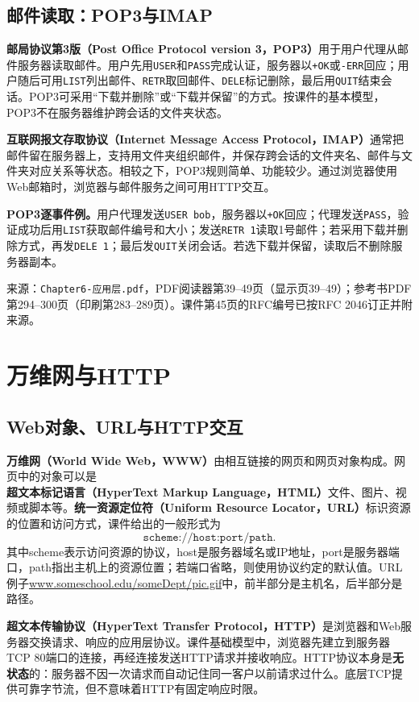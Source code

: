 \subsection{邮件读取：POP3与IMAP}
\textbf{邮局协议第3版（Post Office Protocol version 3，POP3）}用于用户代理从邮件服务器读取邮件。用户先用\texttt{USER}和\texttt{PASS}完成认证，服务器以\texttt{+OK}或\texttt{-ERR}回应；用户随后可用\texttt{LIST}列出邮件、\texttt{RETR}取回邮件、\texttt{DELE}标记删除，最后用\texttt{QUIT}结束会话。POP3可采用“下载并删除”或“下载并保留”的方式。按课件的基本模型，POP3不在服务器维护跨会话的文件夹状态。

\textbf{互联网报文存取协议（Internet Message Access Protocol，IMAP）}通常把邮件留在服务器上，支持用文件夹组织邮件，并保存跨会话的文件夹名、邮件与文件夹对应关系等状态。相较之下，POP3规则简单、功能较少。通过浏览器使用Web邮箱时，浏览器与邮件服务之间可用HTTP交互。

\textbf{POP3逐事件例。}用户代理发送\texttt{USER bob}，服务器以\texttt{+OK}回应；代理发送\texttt{PASS}，验证成功后用\texttt{LIST}获取邮件编号和大小；发送\texttt{RETR 1}读取1号邮件；若采用下载并删除方式，再发\texttt{DELE 1}；最后发\texttt{QUIT}关闭会话。若选下载并保留，读取后不删除服务器副本。

\annotationarea[4]
\small 来源：\texttt{Chapter6-应用层.pdf}，PDF阅读器第39--49页（显示页39--49）；参考书PDF第294--300页（印刷第283--289页）。课件第45页的RFC编号已按RFC 2046订正并附来源。\normalsize

\section{万维网与HTTP}
\subsection{Web对象、URL与HTTP交互}
\textbf{万维网（World Wide Web，WWW）}由相互链接的网页和网页对象构成。网页中的对象可以是\textbf{超文本标记语言（HyperText Markup Language，HTML）}文件、图片、视频或脚本等。\textbf{统一资源定位符（Uniform Resource Locator，URL）}标识资源的位置和访问方式，课件给出的一般形式为
\[
\texttt{scheme://host:port/path}.
\]
其中scheme表示访问资源的协议，host是服务器域名或IP地址，port是服务器端口，path指出主机上的资源位置；若端口省略，则使用协议约定的默认值。URL例子\url{www.someschool.edu/someDept/pic.gif}中，前半部分是主机名，后半部分是路径。

\textbf{超文本传输协议（HyperText Transfer Protocol，HTTP）}是浏览器和Web服务器交换请求、响应的应用层协议。课件基础模型中，浏览器先建立到服务器TCP 80端口的连接，再经连接发送HTTP请求并接收响应。HTTP协议本身是\textbf{无状态}的：服务器不因一次请求而自动记住同一客户以前请求过什么。底层TCP提供可靠字节流，但不意味着HTTP有固定响应时限。

